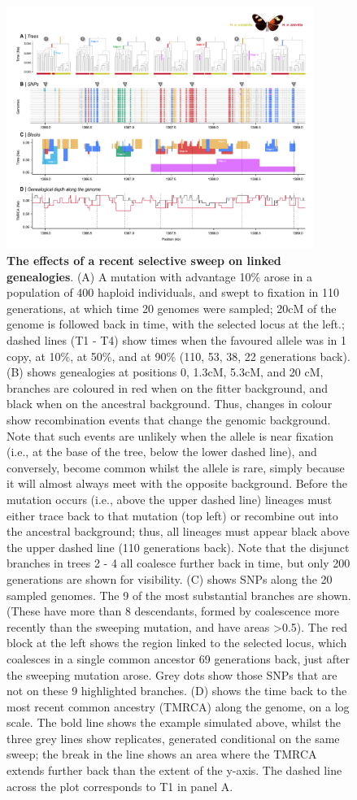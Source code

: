 \documentclass[twocolumn]{bmcart}%
\begin{document}
\begin{figure}
    \includegraphics[width=0.89\textwidth]{Fig_5.pdf}
    \caption{\footnotesize{\textbf{The effects of a recent selective sweep on linked genealogies}. (A) A mutation with advantage 10\% arose in a population of 400 haploid individuals, and swept to fixation in 110 generations, at which time 20 genomes were sampled; 20cM of the genome is followed back in time, with the selected locus at the left.; dashed lines (T1 - T4) show times when the favoured allele was in 1 copy, at 10\%, at 50\%, and at 90\% (110, 53, 38, 22 generations back). (B) shows genealogies at positions 0, 1.3cM, 5.3cM, and 20 cM, branches are coloured in red when on the fitter background, and black when on the ancestral background. Thus, changes in colour show recombination events that change the genomic background. Note that such events are unlikely when the allele is near fixation (i.e., at the base of the tree, below the lower dashed line), and conversely, become common whilst the allele is rare, simply because it will almost always meet with the opposite background. Before the mutation occurs (i.e., above the upper dashed line) lineages must either trace back to that mutation (top left) or recombine out into the ancestral background; thus, all lineages must appear black above the upper dashed line (110 generations back). Note that the disjunct branches in trees 2 - 4 all coalesce further back in time, but only 200 generations are shown for visibility. (C) shows SNPs along the 20 sampled genomes. The 9 of the most substantial branches are shown. (These have more than 8 descendants, formed by coalescence more recently than the sweeping mutation, and have areas >0.5). The red block at the left shows the region linked to the selected locus, which coalesces in a single common ancestor 69 generations back, just after the sweeping mutation arose. Grey dots show those SNPs that are not on these 9 highlighted branches. (D) shows the time back to the most recent common ancestry (TMRCA) along the genome, on a log scale. The bold line shows the example simulated above, whilst the three grey lines show replicates, generated conditional on the same sweep; the break in the line shows an area where the TMRCA extends further back than the extent of the y-axis. The dashed line across the plot corresponds to T1 in panel A.} }
\end{figure}
\end{document}
